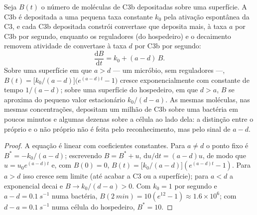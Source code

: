 \begin{theorem}\label{thm:b3:innate-immunity:complement}
Seja $B(t)$ o número de moléculas de C3b depositadas sobre uma
superfície. A C3b é depositada a uma pequena taxa constante $k_{0}$ pela
ativação espontânea da C3, e cada C3b depositada constrói convertase
que deposita mais, à taxa $a$ por C3b por segundo, enquanto os
reguladores (do hospedeiro) e o decaimento removem atividade de
convertase à taxa $d$ por C3b por segundo:
\[
\frac{\mathrm{d}B}{\mathrm{d}t} = k_{0} + (a - d)\,B .
\]
Sobre uma superfície em que $a > d$ --- um micróbio, sem reguladores
---, $B(t) = \bigl[k_{0}/(a-d)\bigr]\bigl(e^{(a-d)t} - 1\bigr)$ cresce
exponencialmente com constante de tempo $1/(a - d)$; sobre uma
superfície do hospedeiro, em que $d > a$, $B$ se aproxima do pequeno
valor estacionário $k_{0}/(d - a)$. As mesmas moléculas, nas mesmas
concentrações, depositam um milhão de C3b sobre uma bactéria em poucos
minutos e algumas dezenas sobre a célula ao lado dela: a distinção
entre o próprio e o não próprio não é feita pelo reconhecimento, mas
pelo sinal de $a - d$.
\end{theorem}
\begin{proof}
A equação é linear com coeficientes constantes. Para $a \ne d$ o ponto
fixo é $B^{*} = -k_{0}/(a-d)$; escrevendo $B = B^{*} + u$,
$\mathrm{d}u/\mathrm{d}t = (a-d)u$, de modo que $u = u_{0}e^{(a-d)t}$ e,
com $B(0) = 0$, $B(t) = \bigl[k_{0}/(a-d)\bigr](e^{(a-d)t} - 1)$. Para
$a > d$ isso cresce sem limite (até acabar a C3 ou a superfície); para
$a < d$ a exponencial decai e $B \to k_{0}/(d-a) > 0$. Com $k_{0} = 1$
por segundo e $a - d = \qty{0.1}{s^{-1}}$ numa bactéria, $B(\qty{2}{min})
= 10(e^{12} - 1) \approx 1.6\times 10^{6}$; com $d - a =
\qty{0.1}{s^{-1}}$ numa célula do hospedeiro, $B^{*} = 10$.
\end{proof}

